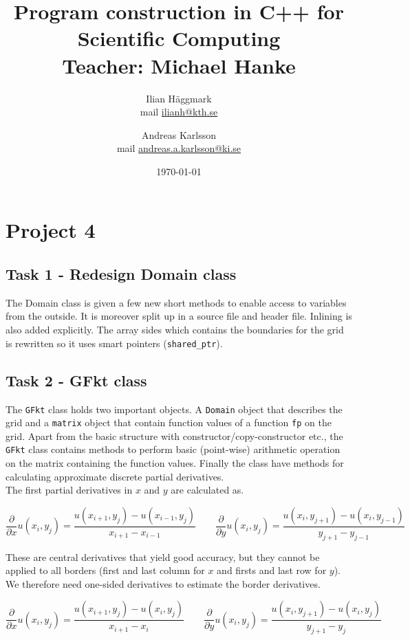 \documentclass[paper=a4, fontsize=12pt]{article} %
\title{Program construction in C++ for Scientific Computing \\ Teacher: Michael Hanke}
\author{Ilian H{\"a}ggmark \\ mail \href{mailto:ilianh@kth.se}{ilianh@kth.se}
  \and Andreas Karlsson \\ mail \href{mailto:andreas.a.karlsson@ki.se}{andreas.a.karlsson@ki.se} }
\date{\normalsize\today} %
\begin{document}
\maketitle %

\section*{Project 4}
\subsection*{Task 1 - Redesign Domain class}

The Domain class is given a few new short methods to enable access to variables from the outside. It is moreover split up in a source file and header file. Inlining is also added explicitly. The array sides which contains the boundaries for the grid is rewritten so it uses smart pointers (\texttt{shared\_ptr}).

\subsection*{Task 2 - GFkt class}

The \texttt{GFkt} class holds two important objects. A \texttt{Domain} object that describes the grid and a \texttt{matrix} object that contain function values of a function \texttt{fp} on the grid. Apart from the basic structure with constructor/copy-constructor etc., the \texttt{GFkt} class contains methods to perform basic (point-wise) arithmetic operation on the matrix containing the function values. Finally the class have methods for calculating approximate discrete partial derivatives. \\

The first partial derivatives in $x$ and $y$ are calculated as.

$$ \frac{\partial}{\partial x} u(x_i,y_j)  = \frac{u(x_{i+1},y_j)-u(x_{i-1},y_j)}{x_{i+1} - x_{i-1}} \qquad  \frac{\partial}{\partial y} u(x_i,y_j)  = \frac{u(x_{i},y_{j+1})-u(x_{i},y_{j-1})}{y_{j+1} - y_{j-1}}$$

These are central derivatives that yield good accuracy, but they cannot be applied to all borders (first and last column for $x$ and firsts and last row for $y$). We therefore need one-sided derivatives to estimate the border derivatives.

$$ \frac{\partial}{\partial x} u(x_i,y_j)  = \frac{u(x_{i+1},y_j)-u(x_{i},y_j)}{x_{i+1} - x_{i}} \qquad  \frac{\partial}{\partial y} u(x_i,y_j)  = \frac{u(x_{i},y_{j+1})-u(x_{i},y_{j})}{y_{j+1} - y_{j}}$$
\end{document}
